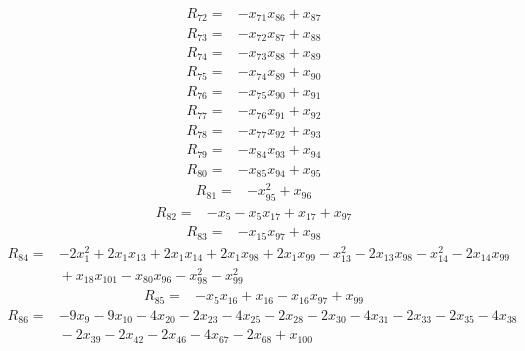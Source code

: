 \begin{align*}
R_{72}={}& -x_{71}x_{86} + x_{87}
\end{align*}
\begin{align*}
R_{73}={}& -x_{72}x_{87} + x_{88}
\end{align*}
\begin{align*}
R_{74}={}& -x_{73}x_{88} + x_{89}
\end{align*}
\begin{align*}
R_{75}={}& -x_{74}x_{89} + x_{90}
\end{align*}
\begin{align*}
R_{76}={}& -x_{75}x_{90} + x_{91}
\end{align*}
\begin{align*}
R_{77}={}& -x_{76}x_{91} + x_{92}
\end{align*}
\begin{align*}
R_{78}={}& -x_{77}x_{92} + x_{93}
\end{align*}
\begin{align*}
R_{79}={}& -x_{84}x_{93} + x_{94}
\end{align*}
\begin{align*}
R_{80}={}& -x_{85}x_{94} + x_{95}
\end{align*}
\begin{align*}
R_{81}={}& -x_{95}^{2} + x_{96}
\end{align*}
\begin{align*}
R_{82}={}& -x_{5} - x_{5}x_{17} + x_{17} + x_{97}
\end{align*}
\begin{align*}
R_{83}={}& -x_{15}x_{97} + x_{98}
\end{align*}
\begin{align*}
R_{84}={}& -2x_{1}^{2} + 2x_{1}x_{13} + 2x_{1}x_{14} + 2x_{1}x_{98} + 2x_{1}x_{99} - x_{13}^{2} - 2x_{13}x_{98} - x_{14}^{2} - 2x_{14}x_{99} \\
&{} + x_{18}x_{101} - x_{80}x_{96} - x_{98}^{2} - x_{99}^{2}
\end{align*}
\begin{align*}
R_{85}={}& -x_{5}x_{16} + x_{16} - x_{16}x_{97} + x_{99}
\end{align*}
\begin{align*}
R_{86}={}& -9x_{9} - 9x_{10} - 4x_{20} - 2x_{23} - 4x_{25} - 2x_{28} - 2x_{30} - 4x_{31} - 2x_{33} - 2x_{35} - 4x_{38} \\
&{} - 2x_{39} - 2x_{42} - 2x_{46} - 4x_{67} - 2x_{68} + x_{100}
\end{align*}
